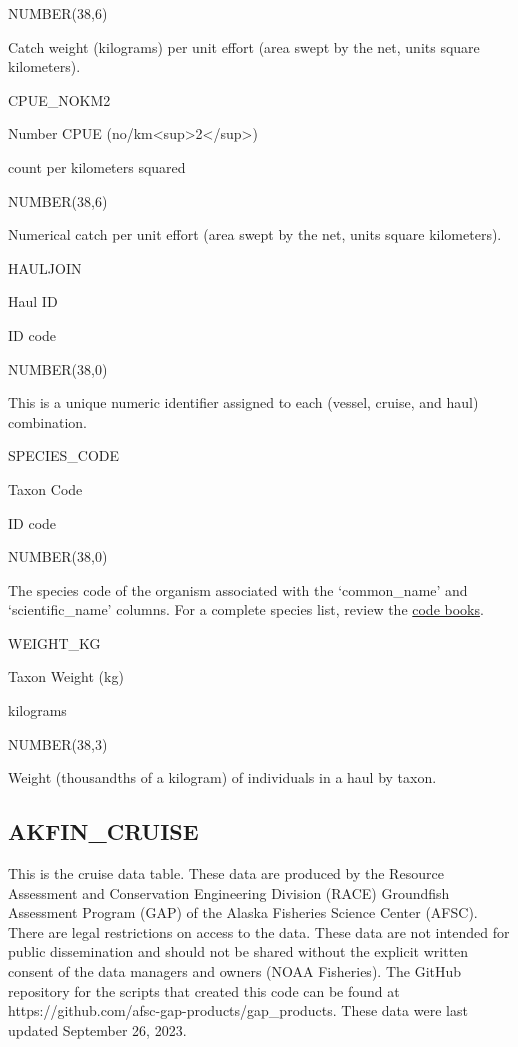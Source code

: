 \documentclass[
  letterpaper,
  oneside,
  open=any]{scrbook}
\begin{document}
NUMBER(38,6)

Catch weight (kilograms) per unit effort (area swept by the net, units
square kilometers).

CPUE\_NOKM2

Number CPUE (no/km\textless sup\textgreater2\textless/sup\textgreater)

count per kilometers squared

NUMBER(38,6)

Numerical catch per unit effort (area swept by the net, units square
kilometers).

HAULJOIN

Haul ID

ID code

NUMBER(38,0)

This is a unique numeric identifier assigned to each (vessel, cruise,
and haul) combination.

SPECIES\_CODE

Taxon Code

ID code

NUMBER(38,0)

The species code of the organism associated with the `common\_name' and
`scientific\_name' columns. For a complete species list, review the
\href{https://www.fisheries.noaa.gov/resource/document/groundfish-survey-species-code-manual-and-data-codes-manual}{code
books}.

WEIGHT\_KG

Taxon Weight (kg)

kilograms

NUMBER(38,3)

Weight (thousandths of a kilogram) of individuals in a haul by taxon.

\hypertarget{akfin_cruise}{%
\subsection{AKFIN\_CRUISE}\label{akfin_cruise}}

This is the cruise data table. These data are produced by the Resource
Assessment and Conservation Engineering Division (RACE) Groundfish
Assessment Program (GAP) of the Alaska Fisheries Science Center (AFSC).
There are legal restrictions on access to the data. These data are not
intended for public dissemination and should not be shared without the
explicit written consent of the data managers and owners (NOAA
Fisheries). The GitHub repository for the scripts that created this code
can be found at https://github.com/afsc-gap-products/gap\_products.
These data were last updated September 26, 2023.
\end{document}

